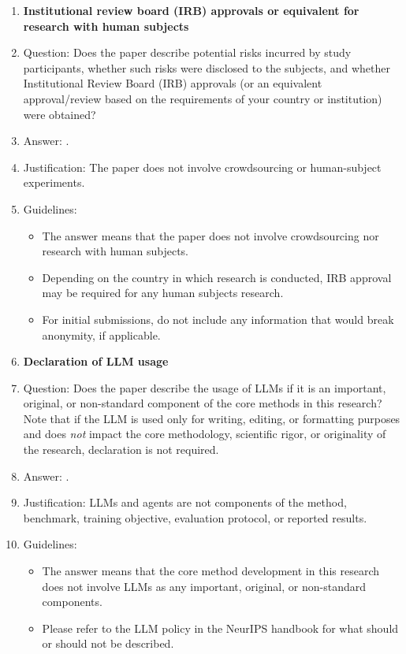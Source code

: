 \begin{enumerate}
\item {\bf Institutional review board (IRB) approvals or equivalent for research with human subjects}
    \item[] Question: Does the paper describe potential risks incurred by study participants, whether such risks were disclosed to the subjects, and whether Institutional Review Board (IRB) approvals (or an equivalent approval/review based on the requirements of your country or institution) were obtained?
    \item[] Answer: \answerNA{}.
    \item[] Justification: The paper does not involve crowdsourcing or human-subject experiments.
    \item[] Guidelines:
    \begin{itemize}
        \item The answer \answerNA{} means that the paper does not involve crowdsourcing nor research with human subjects.
        \item Depending on the country in which research is conducted, IRB approval may be required for any human subjects research.
        \item For initial submissions, do not include any information that would break anonymity, if applicable.
    \end{itemize}

\item {\bf Declaration of LLM usage}
    \item[] Question: Does the paper describe the usage of LLMs if it is an important, original, or non-standard component of the core methods in this research? Note that if the LLM is used only for writing, editing, or formatting purposes and does \emph{not} impact the core methodology, scientific rigor, or originality of the research, declaration is not required.
    \item[] Answer: \answerNA{}.
    \item[] Justification: LLMs and agents are not components of the \PTA{} method, benchmark, training objective, evaluation protocol, or reported results.
    \item[] Guidelines:
    \begin{itemize}
        \item The answer \answerNA{} means that the core method development in this research does not involve LLMs as any important, original, or non-standard components.
        \item Please refer to the LLM policy in the NeurIPS handbook for what should or should not be described.
    \end{itemize}

\end{enumerate}
